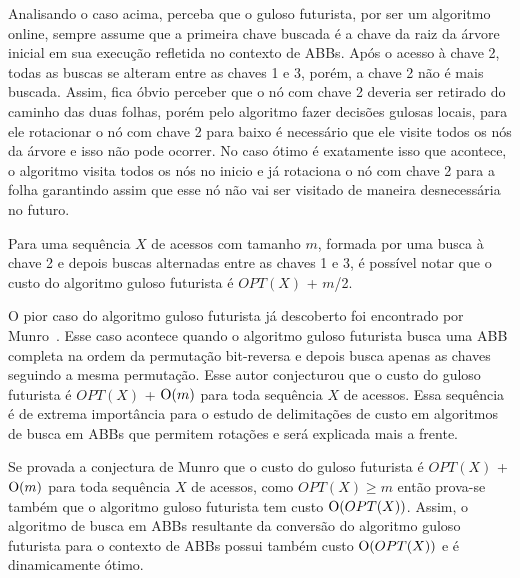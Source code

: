 Analisando o caso acima, perceba que o guloso futurista, por ser um algoritmo online, sempre assume que a primeira chave buscada é a chave da raiz da árvore inicial em sua execução refletida no contexto de ABBs. Após o acesso à chave 2, todas as buscas se alteram entre as chaves 1 e 3, porém, a chave 2 não é mais buscada. Assim, fica óbvio perceber que o nó com chave 2 deveria ser retirado do caminho das duas folhas, porém pelo algoritmo fazer decisões gulosas locais, para ele rotacionar o nó com chave 2 para baixo é necessário que ele visite todos os nós da árvore e isso não pode ocorrer. No caso ótimo é exatamente isso que acontece, o algoritmo visita todos os nós no inicio e já rotaciona o nó com chave 2 para a folha garantindo assim que esse nó não vai ser visitado de maneira desnecessária no futuro.

Para uma sequência $X$ de acessos com tamanho $m$, formada por uma busca à chave 2 e depois buscas alternadas entre as chaves 1 e 3, é possível notar que o custo do algoritmo guloso futurista é $OPT(X)$ + $m$/2.

O pior caso do algoritmo guloso futurista já descoberto foi encontrado por Munro~\cite{munro}. Esse caso acontece quando o algoritmo guloso futurista busca uma ABB completa na ordem da permutação bit-reversa e depois busca apenas as chaves seguindo a mesma permutação. Esse autor conjecturou que o custo do guloso futurista é $OPT(X)$ + $\mathrm{O}(m)$ para toda sequência $X$ de acessos. Essa sequência é de extrema importância para o estudo de delimitações de custo em algoritmos de busca em ABBs que permitem rotações e será explicada mais a frente.

Se provada a conjectura de Munro que o custo do guloso futurista é $OPT(X)$ + $\mathrm{O}(m)$ para toda sequência $X$ de acessos, como $OPT(X) \geq m$ então prova-se também que o algoritmo guloso futurista tem custo $\mathrm{O}(OPT(X))$. Assim, o algoritmo de busca em ABBs resultante da conversão do algoritmo guloso futurista para o contexto de ABBs possui também custo $\mathrm{O}(OPT(X))$ e é dinamicamente ótimo.